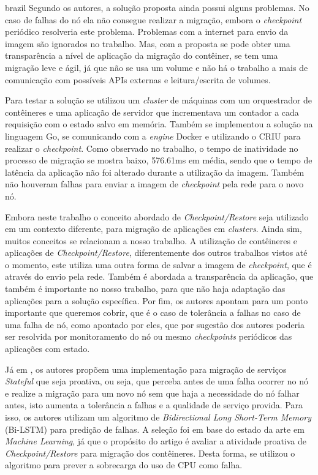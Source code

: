 \begin{otherlanguage*}{brazil}
Segundo os autores, a solução proposta ainda possui alguns problemas. No
caso de falhas do nó ela não consegue realizar a migração, embora o
\textit{checkpoint} periódico resolveria este problema. Problemas com a internet
para envio da imagem são ignorados no trabalho. Mas, com a proposta se pode obter uma
transparência a nível de aplicação da migração do contêiner, se tem uma
migração leve e ágil, já que não se usa um volume e não há o trabalho
a mais de comunicação com possíveis APIs externas e leitura/escrita de volumes.

Para testar a solução se utilizou um \textit{cluster} de máquinas com um
orquestrador de contêineres e uma aplicação de servidor que incrementava
um contador a cada requisição com o estado salvo em memória. Também se
implementou a solução na linguagem Go, se comunicando com a \textit{engine}
Docker e utilizando o CRIU para realizar o \textit{checkpoint}. Como
observado no trabalho, o tempo de inatividade no processo de migração se
mostra baixo, 576.61ms em média, sendo que o tempo de latência da aplicação
não foi alterado durante a utilização da imagem. Também não houveram
falhas para enviar a imagem de \textit{checkpoint} pela rede para o novo nó.

Embora neste trabalho o conceito abordado de \textit{Checkpoint/Restore}
seja utilizado em um contexto diferente, para migração de aplicações em
\textit{clusters}. Ainda sim, muitos conceitos se relacionam a nosso trabalho.
A utilização de contêineres e aplicações de \textit{Checkpoint/Restore},
diferentemente dos outros trabalhos vistos até o momento, este utiliza uma
outra forma de salvar a imagem de \textit{checkpoint}, que é através do envio
pela rede. Também é abordada a transparência da aplicação, que também é
importante no nosso trabalho, para que não haja adaptação das aplicações
para a solução específica. Por fim, os autores apontam para um ponto
importante que queremos cobrir, que é o caso de tolerância a falhas no caso
de uma falha de nó, como apontado por eles, que por sugestão dos autores
poderia ser resolvida por monitoramento do nó ou mesmo \textit{checkpoints}
periódicos das aplicações com estado.

Já em \cite{tran2022proactive}, os autores propõem uma implementação
para migração de serviços \textit{Stateful} que seja proativa, ou seja,
que perceba antes de uma falha ocorrer no nó e realize a migração para
um novo nó sem que haja a necessidade do nó falhar antes, isto aumenta
a tolerância a falhas e a qualidade de serviço provida. Para isso, os
autores utilizam um algoritmo de \textit{Bidirectional Long Short-Term
Memory} (Bi-LSTM) para predição de falhas. A seleção foi em base do estado
da arte em \textit{Machine Learning}, já que o propósito do artigo é
avaliar a atividade proativa de \textit{Checkpoint/Restore} para
migração dos contêineres. Desta forma, se utilizou o algoritmo para prever
a sobrecarga do uso de CPU como falha.


\end{otherlanguage*}
